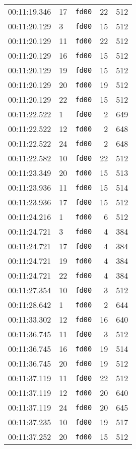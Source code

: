 \documentclass{article}
\begin{document}
\begin{longtable}{lllrr}
00:11:19.346 & 17 & \texttt{fd00} & 22 & 512 \\
00:11:20.129 & 3 & \texttt{fd00} & 15 & 512 \\
00:11:20.129 & 11 & \texttt{fd00} & 22 & 512 \\
00:11:20.129 & 16 & \texttt{fd00} & 15 & 512 \\
00:11:20.129 & 19 & \texttt{fd00} & 15 & 512 \\
00:11:20.129 & 20 & \texttt{fd00} & 19 & 512 \\
00:11:20.129 & 22 & \texttt{fd00} & 15 & 512 \\
00:11:22.522 & 1 & \texttt{fd00} & 2 & 649 \\
00:11:22.522 & 12 & \texttt{fd00} & 2 & 648 \\
00:11:22.522 & 24 & \texttt{fd00} & 2 & 648 \\
00:11:22.582 & 10 & \texttt{fd00} & 22 & 512 \\
00:11:23.349 & 20 & \texttt{fd00} & 15 & 513 \\
00:11:23.936 & 11 & \texttt{fd00} & 15 & 514 \\
00:11:23.936 & 17 & \texttt{fd00} & 15 & 512 \\
00:11:24.216 & 1 & \texttt{fd00} & 6 & 512 \\
00:11:24.721 & 3 & \texttt{fd00} & 4 & 384 \\
00:11:24.721 & 17 & \texttt{fd00} & 4 & 384 \\
00:11:24.721 & 19 & \texttt{fd00} & 4 & 384 \\
00:11:24.721 & 22 & \texttt{fd00} & 4 & 384 \\
00:11:27.354 & 10 & \texttt{fd00} & 3 & 512 \\
00:11:28.642 & 1 & \texttt{fd00} & 2 & 644 \\
00:11:33.302 & 12 & \texttt{fd00} & 16 & 640 \\
00:11:36.745 & 11 & \texttt{fd00} & 3 & 512 \\
00:11:36.745 & 16 & \texttt{fd00} & 19 & 514 \\
00:11:36.745 & 20 & \texttt{fd00} & 19 & 512 \\
00:11:37.119 & 11 & \texttt{fd00} & 22 & 512 \\
00:11:37.119 & 12 & \texttt{fd00} & 20 & 640 \\
00:11:37.119 & 24 & \texttt{fd00} & 20 & 645 \\
00:11:37.235 & 10 & \texttt{fd00} & 19 & 517 \\
00:11:37.252 & 20 & \texttt{fd00} & 15 & 512 \\

\end{longtable}
\end{document}
